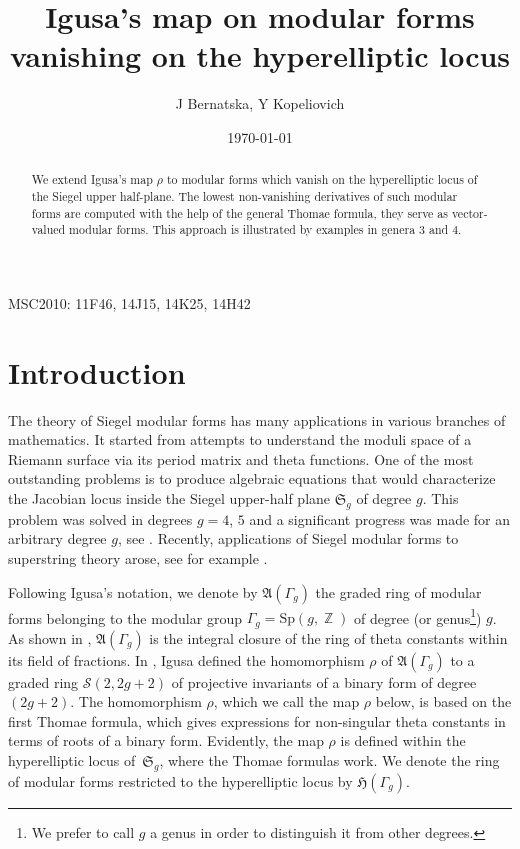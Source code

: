 \documentclass[twoside]{amsart}
\title[Igusa's map on vanishing hyperelliptic modular forms]
{Igusa's map on modular forms vanishing on the hyperelliptic locus }
\author{J Bernatska, Y Kopeliovich}
\date{\today}
\DeclareMathOperator{\Integer}{\mathbb{Z}}
\theoremstyle{definition}
\theoremstyle{plain}
\begin{document}
 
\maketitle 
\begin{abstract}
We extend Igusa's map $\rho$ to modular forms which vanish 
on the hyperelliptic locus of the Siegel upper half-plane. 
The lowest non-vanishing derivatives of such modular forms are computed
with the help of the general Thomae formula, they serve as vector-valued modular forms.
This approach is illustrated by examples in genera $3$ and $4$.
\end{abstract}

MSC2010:  11F46, 14J15, 14K25, 14H42

\section{Introduction}

The theory of Siegel modular forms 
 has many applications in various branches of mathematics. 
 It started from attempts to understand the moduli space of a Riemann surface via its period matrix and theta functions. 
One of the most outstanding problems is to produce algebraic equations that would characterize 
the Jacobian locus inside  the Siegel upper-half plane $\mathfrak{S}_g$ of degree $g$. 
This problem was solved in degrees 
$g=4$, $5$ and a significant progress was made for an arbitrary degree $g$, see \cite{FarGrMan}. 
Recently, applications of Siegel modular forms to superstring theory arose, see for example \cite{GrMa}.


Following Igusa's notation, we denote by $\mathfrak{A}(\Gamma_g)$ the graded ring of modular 
forms belonging to the modular 
 group $\Gamma_g = \mathrm{Sp}(g,\Integer)$ of degree (or genus\footnote{We prefer to call $g$ a genus
 in order to distinguish it from other degrees.}) $g$. As shown in \cite{Ig1964},
 $\mathfrak{A}(\Gamma_g)$ is the integral closure of the ring of theta constants
within its field of fractions. 
In \cite{Ig1967},  Igusa defined the homomorphism $\rho$ of $\mathfrak{A}(\Gamma_g)$
to a graded ring $\mathcal{S}(2,2g+2)$ of projective invariants of a binary form of degree $(2g+2)$. 
The homomorphism $\rho$, which we call the map $\rho$ below,
is based on the first Thomae formula, which gives expressions for non-singular theta constants
in terms of roots of  a binary form.  Evidently, the map $\rho$ is defined within the hyperelliptic locus  
of~$\mathfrak{S}_g$,  where the Thomae formulas work. We denote the ring of modular 
forms restricted to the hyperelliptic locus by $\mathfrak{H}(\Gamma_g)$.
\end{document}
